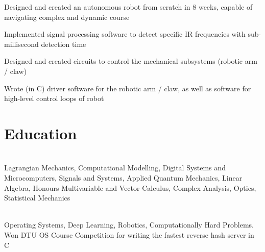 \documentclass[]{deedy-resume-openfont}
\begin{document}
\begin{tightemize}
    \item Designed and created an autonomous robot from scratch in 8 weeks, capable of navigating complex and dynamic course
    \item Implemented signal processing software to detect specific IR frequencies with sub-millisecond detection time
    \item Designed and created circuits to control the mechanical subsystems (robotic arm / claw)
    \item Wrote (in C) driver software for the robotic arm / claw, as well as software for high-level control loops of robot
\end{tightemize}

\vspace{12pt}


\section{Education}

\begin{adjustwidth}{0.55cm}{1.25cm}
   \\
   Lagrangian Mechanics, Computational Modelling, Digital Systems and Microcomputers, Signals and Systems, Applied Quantum Mechanics, Linear Algebra, Honours Multivariable and Vector Calculus, Complex Analysis, Optics, Statistical Mechanics
\end{adjustwidth}

\vspace{8pt}

\begin{adjustwidth}{0.55cm}{1.25cm}
   \\
   Operating Systems, Deep Learning, Robotics, Computationally Hard Problems. \\
  Won DTU OS Course Competition for writing the fastest reverse hash server in C
\end{adjustwidth}

\vspace{10pt}
\end{document}
